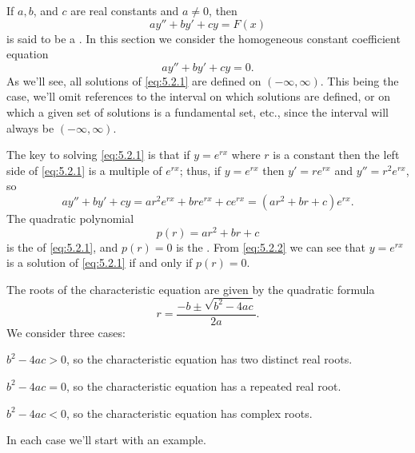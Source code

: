 If $a,b$, and $c$ are real constants and $a\ne0$, then
\[
ay''+by'+cy=F(x)
\]
is said to be a .
In this section we  consider the homogeneous constant
coefficient equation
\begin{equation} \label{eq:5.2.1}
ay''+by'+cy=0.
\end{equation}
As we'll see, all solutions of \eqref{eq:5.2.1} are defined on
$(-\infty,\infty)$.  This being the case, we'll omit references to the
interval on which solutions are defined, or on which a given set of
solutions is a fundamental set, etc., since the interval will always
be $(-\infty,\infty)$.

The key to solving \eqref{eq:5.2.1} is  that if
 $y=e^{rx}$ where $r$ is a constant  then the left side of
\eqref{eq:5.2.1} is a  multiple of $e^{rx}$;   thus, if $y=e^{rx}$
 then $y'=re^{rx}$ and $y''=r^2e^{rx}$, so
\begin{equation} \label{eq:5.2.2}
ay''+by'+cy=ar^2e^{rx}+bre^{rx}+ce^{rx}=(ar^2+br+c)e^{rx}.
\end{equation}
The quadratic polynomial
\[
p(r)=ar^2+br+c
\]
is  the 
of \eqref{eq:5.2.1}, and $p(r)=0$
is  the .
From \eqref{eq:5.2.2} we can see that $y=e^{rx}$ is a solution of
\eqref{eq:5.2.1}  if and only if $p(r)=0$.

The roots of  the  characteristic equation are given by the quadratic
formula
\begin{equation} \label{eq:5.2.3}
r=\frac{-b\pm\sqrt{b^2-4ac}}{2a}.
\end{equation}
We consider three cases:
\begin{enumext}[label=\arabic*,wrap-label={\textsc{Case} #1.},labelwidth=4em]
\item $b^2-4ac>0$, so the characteristic equation has two
distinct real roots.
\item $b^2-4ac=0$, so the characteristic equation has a
repeated real root.
\item $b^2-4ac<0$, so the characteristic equation has
complex roots.
\end{enumext}
In each case we'll start with an example.



